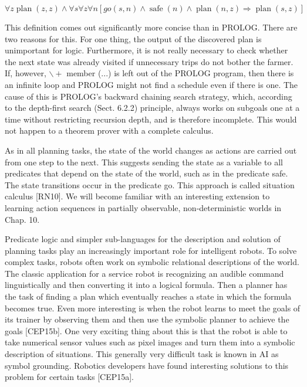 \documentclass[10pt]{article}
\begin{document}
$$
\forall z \operatorname{plan}(z, z) \wedge \forall s \forall z \forall n[g o(s, n) \wedge \operatorname{safe}(n) \wedge \operatorname{plan}(n, z) \Rightarrow \operatorname{plan}(s, z)]
$$

This definition comes out significantly more concise than in PROLOG. There are two reasons for this. For one thing, the output of the discovered plan is unimportant for logic. Furthermore, it is not really necessary to check whether the next state was already visited if unnecessary trips do not bother the farmer. If, however, $\backslash+$ member (...) is left out of the PROLOG program, then there is an infinite loop and PROLOG might not find a schedule even if there is one. The cause of this is PROLOG's backward chaining search strategy, which, according to the depth-first search (Sect. 6.2.2) principle, always works on subgoals one at a time without restricting recursion depth, and is therefore incomplete. This would not happen to a theorem prover with a complete calculus.

As in all planning tasks, the state of the world changes as actions are carried out from one step to the next. This suggests sending the state as a variable to all predicates that depend on the state of the world, such as in the predicate safe. The state transitions occur in the predicate go. This approach is called situation calculus [RN10]. We will become familiar with an interesting extension to learning action sequences in partially observable, non-deterministic worlds in Chap. 10.

Predicate logic and simpler sub-languages for the description and solution of planning tasks play an increasingly important role for intelligent robots. To solve complex tasks, robots often work on symbolic relational descriptions of the world. The classic application for a service robot is recognizing an audible command linguistically and then converting it into a logical formula. Then a planner has the task of finding a plan which eventually reaches a state in which the formula becomes true. Even more interesting is when the robot learns to meet the goals of its trainer by observing them and then use the symbolic planner to achieve the goals [CEP15b]. One very exciting thing about this is that the robot is able to take numerical sensor values such as pixel images and turn them into a symbolic description of situations. This generally very difficult task is known in AI as symbol grounding. Robotics developers have found interesting solutions to this problem for certain tasks [CEP15a].
\end{document}
